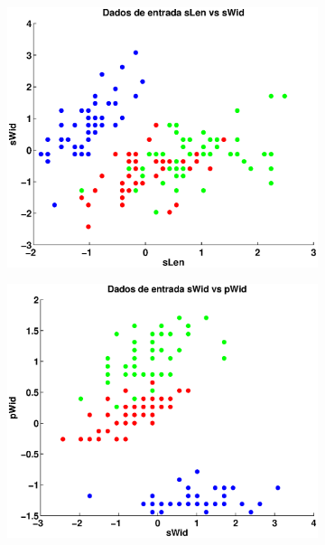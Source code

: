 \documentclass[12pt,journal,onecolumn]{IEEEtran}
\begin{document}
\begin{figure}[h]
	\begin{subfigure}[h]{0.3\textwidth}
		\includegraphics[width=\textwidth]{eps/3classes/input/sLen-vs-sWid.eps}
	\end{subfigure} 
	\begin{subfigure}[h]{0.3\textwidth}
		\includegraphics[width=\textwidth]{eps/3classes/input/sWid-vs-pWid.eps}
	\end{subfigure} 
	\begin{subfigure}[h]{0.3\textwidth}

\end{subfigure}
\end{figure}
\end{document}
